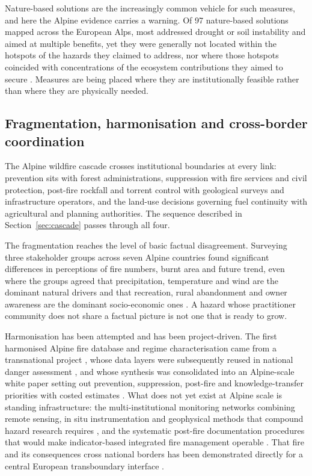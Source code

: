 \documentclass[11pt,a4paper]{article}
\begin{document}
Nature-based solutions are the increasingly common vehicle for such measures, and here the Alpine evidence carries a warning. Of 97 nature-based solutions mapped across the European Alps, most addressed drought or soil instability and aimed at multiple benefits, yet they were generally not located within the hotspots of the hazards they claimed to address, nor where those hotspots coincided with concentrations of the ecosystem contributions they aimed to secure \citep{dubo_nature-based_2023}. Measures are being placed where they are institutionally feasible rather than where they are physically needed.

\subsection{Fragmentation, harmonisation and cross-border coordination}

The Alpine wildfire cascade crosses institutional boundaries at every link: prevention sits with forest administrations, suppression with fire services and civil protection, post-fire rockfall and torrent control with geological surveys and infrastructure operators, and the land-use decisions governing fuel continuity with agricultural and planning authorities. The sequence described in Section~\ref{sec:cascade} passes through all four.

The fragmentation reaches the level of basic factual disagreement. Surveying three stakeholder groups across seven Alpine countries found significant differences in perceptions of fire numbers, burnt area and future trend, even where the groups agreed that precipitation, temperature and wind are the dominant natural drivers and that recreation, rural abandonment and owner awareness are the dominant socio-economic ones \citep{hoang_stakeholders_2026}. A hazard whose practitioner community does not share a factual picture is not one that is ready to grow.

Harmonisation has been attempted and has been project-driven. The first harmonised Alpine fire database and regime characterisation came from a transnational project \citep{valese_wildfires_2011}, whose data layers were subsequently reused in national danger assessment \citep{muller_towards_2020}, and whose synthesis was consolidated into an Alpine-scale white paper setting out prevention, suppression, post-fire and knowledge-transfer priorities with costed estimates \citep{muller_forest_2020}. What does not yet exist at Alpine scale is standing infrastructure: the multi-institutional monitoring networks combining remote sensing, in situ instrumentation and geophysical methods that compound hazard research requires \citep{baselt_compound_2026}, and the systematic post-fire documentation procedures that would make indicator-based integrated fire management operable \citep{melzner_wildfire-induced_2025}. That fire and its consequences cross national borders has been demonstrated directly for a central European transboundary interface \citep{avouris_exposure_2025}.
\end{document}
